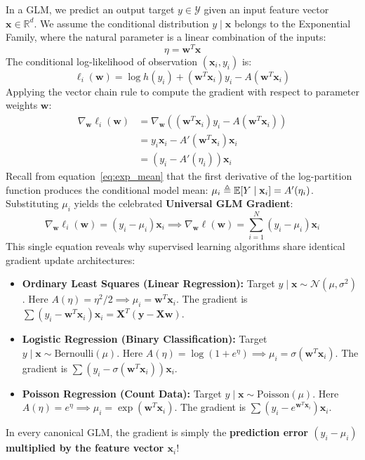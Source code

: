 In a GLM, we predict an output target $y \in \mathcal{Y}$ given an input feature vector $\mathbf{x} \in \mathbb{R}^d$. We assume the conditional distribution $y \mid \mathbf{x}$ belongs to the Exponential Family, where the natural parameter is a linear combination of the inputs:
\begin{equation}
\eta = \mathbf{w}^T \mathbf{x}
\end{equation}
The conditional log-likelihood of observation $(\mathbf{x}_i, y_i)$ is:
\begin{equation}
\ell_i(\mathbf{w}) = \log h(y_i) + (\mathbf{w}^T \mathbf{x}_i) y_i - A(\mathbf{w}^T \mathbf{x}_i)
\end{equation}
Applying the vector chain rule to compute the gradient with respect to parameter weights $\mathbf{w}$:
\begin{align}
\nabla_{\mathbf{w}} \ell_i(\mathbf{w}) &= \nabla_{\mathbf{w}} \left( (\mathbf{w}^T \mathbf{x}_i) y_i - A(\mathbf{w}^T \mathbf{x}_i) \right) \nonumber \\
&= y_i \mathbf{x}_i - A'(\mathbf{w}^T \mathbf{x}_i) \mathbf{x}_i \nonumber \\
&= \left( y_i - A'(\eta_i) \right) \mathbf{x}_i
\end{align}
Recall from equation~\eqref{eq:exp_mean} that the first derivative of the log-partition function produces the conditional model mean: $\mu_i \triangleq \operatorname{\mathbb{E}}[Y \mid \mathbf{x}_i] = A'(\eta_i)$. Substituting $\mu_i$ yields the celebrated \textbf{Universal GLM Gradient}:
\begin{equation}
\nabla_{\mathbf{w}} \ell_i(\mathbf{w}) = (y_i - \mu_i)\mathbf{x}_i \implies \nabla_{\mathbf{w}} \ell(\mathbf{w}) = \sum_{i=1}^N (y_i - \mu_i)\mathbf{x}_i
\label{eq:universal_glm_gradient}
\end{equation}
This single equation reveals why supervised learning algorithms share identical gradient update architectures:
\begin{itemize}
    \item \textbf{Ordinary Least Squares (Linear Regression):} Target $y \mid \mathbf{x} \sim \mathcal{N}(\mu, \sigma^2)$. Here $A(\eta) = \eta^2/2 \implies \mu_i = \mathbf{w}^T \mathbf{x}_i$. The gradient is $\sum (y_i - \mathbf{w}^T \mathbf{x}_i)\mathbf{x}_i = \mathbf{X}^T(\mathbf{y} - \mathbf{X}\mathbf{w})$.
    \item \textbf{Logistic Regression (Binary Classification):} Target $y \mid \mathbf{x} \sim \text{Bernoulli}(\mu)$. Here $A(\eta) = \log(1 + e^\eta) \implies \mu_i = \sigma(\mathbf{w}^T \mathbf{x}_i)$. The gradient is $\sum (y_i - \sigma(\mathbf{w}^T \mathbf{x}_i))\mathbf{x}_i$.
    \item \textbf{Poisson Regression (Count Data):} Target $y \mid \mathbf{x} \sim \text{Poisson}(\mu)$. Here $A(\eta) = e^\eta \implies \mu_i = \exp(\mathbf{w}^T \mathbf{x}_i)$. The gradient is $\sum (y_i - e^{\mathbf{w}^T \mathbf{x}_i})\mathbf{x}_i$.
\end{itemize}
In every canonical GLM, the gradient is simply the \textbf{prediction error $(y_i - \mu_i)$ multiplied by the feature vector $\mathbf{x}_i$}!

